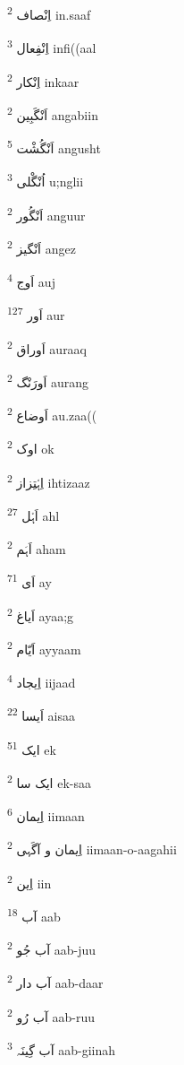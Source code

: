 \documentclass[12pt]{article}
\begin{document}
\begin{RTL}
\begin{multicols}{5}
{\ur اِنْصاف}   \textsuperscript{2} in.saaf

{\ur اِنْفِعال}   \textsuperscript{3} infi((aal

{\ur اِنْکار}   \textsuperscript{2} inkaar

{\ur اَنْگَبِین}   \textsuperscript{2} angabiin

{\ur اَنْگُشْت}   \textsuperscript{5} angusht

{\ur اُنْگْلی}   \textsuperscript{3} u;nglii

{\ur اَنْگُور}   \textsuperscript{2} anguur

{\ur اَنْگیز}   \textsuperscript{2} angez

{\ur اَوج}   \textsuperscript{4} auj

{\ur اَور}   \textsuperscript{127} aur

{\ur اَوراق}   \textsuperscript{2} auraaq

{\ur اَورَنْگ}   \textsuperscript{2} aurang

{\ur اَوضاع}   \textsuperscript{2} au.zaa((

{\ur اوک}   \textsuperscript{2} ok

{\ur اِہْتِزاز}   \textsuperscript{2} ihtizaaz

{\ur اَہْل}   \textsuperscript{27} ahl

{\ur اَہَم}   \textsuperscript{2} aham

{\ur اَی}   \textsuperscript{71} ay

{\ur اَیاغ}   \textsuperscript{2} ayaa;g

{\ur اَیّام}   \textsuperscript{2} ayyaam

{\ur اِیجاد}   \textsuperscript{4} iijaad

{\ur اَیسا}   \textsuperscript{22} aisaa

{\ur ایک}   \textsuperscript{51} ek

{\ur ایک سا}   \textsuperscript{2} ek-saa

{\ur اِیمان}   \textsuperscript{6} iimaan

{\ur اِیمان و آگَہی}   \textsuperscript{2} iimaan-o-aagahii

{\ur اِین}   \textsuperscript{2} iin

{\ur آب}   \textsuperscript{18} aab

{\ur آب جُو}   \textsuperscript{2} aab-juu

{\ur آب دار}   \textsuperscript{2} aab-daar

{\ur آب رُو}   \textsuperscript{2} aab-ruu

{\ur آب گِینَہ}   \textsuperscript{3} aab-giinah


\end{multicols}
\end{RTL}
\end{document}
